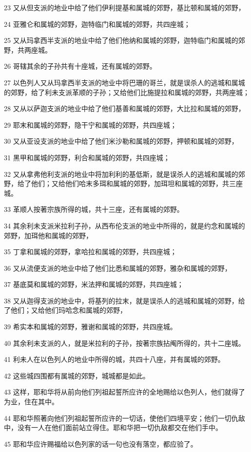 \par 23 又从但支派的地业中给了他们伊利提基和属城的郊野，基比顿和属城的郊野，
\par 24 亚雅仑和属城的郊野，迦特临门和属城的郊野，共四座城；
\par 25 又从玛拿西半支派的地业中给了他们他纳和属城的郊野，迦特临门和属城的郊野，共两座城。
\par 26 哥辖其余的子孙共有十座城，还有属城的郊野。
\par 27 以色列人又从玛拿西半支派的地业中将巴珊的哥兰，就是误杀人的逃城和属城的郊野，给了利未支派革顺的子孙；又给他们比施提拉和属城的郊野，共两座城；
\par 28 又从以萨迦支派的地业中给了他们基善和属城的郊野，大比拉和属城的郊野，
\par 29 耶末和属城的郊野，隐干宁和属城的郊野，共四座城；
\par 30 又从亚设支派的地业中给了他们米沙勒和属城的郊野，押顿和属城的郊野，
\par 31 黑甲和属城的郊野，利合和属城的郊野，共四座城；
\par 32 又从拿弗他利支派的地业中将加利利的基低斯，就是误杀人的逃城和属城的郊野，给了他们；又给他们哈末多珥和属城的郊野，加珥坦和属城的郊野，共三座城。
\par 33 革顺人按著宗族所得的城，共十三座，还有属城的郊野。
\par 34 其余利未支派米拉利子孙，从西布伦支派的地业中所得的，就是约念和属城的郊野，加珥他和属城的郊野，
\par 35 丁拿和属城的郊野，拿哈拉和属城的郊野，共四座城；
\par 36 又从流便支派的地业中给了他们比悉和属城的郊野，雅杂和属城的郊野，
\par 37 基底莫和属城的郊野，米法押和属城的郊野，共四座城；
\par 38 又从迦得支派的地业中，将基列的拉末，就是误杀人的逃城和属城的郊野，给了他们；又给他们玛哈念和属城的郊野，
\par 39 希实本和属城的郊野，雅谢和属城的郊野，共四座城。
\par 40 其余利未支派的人，就是米拉利的子孙，按著宗族拈阄所得的，共十二座城。
\par 41 利未人在以色列人的地业中所得的城，共四十八座，并有属城的郊野。
\par 42 这些城四围都有属城的郊野，城城都是如此。
\par 43 这样，耶和华将从前向他们列祖起誓所应许的全地赐给以色列人，他们就得了为业，住在其中。
\par 44 耶和华照著向他们列祖起誓所应许的一切话，使他们四境平安；他们一切仇敌中，没有一人在他们面前站立得住。耶和华把一切仇敌都交在他们手中。
\par 45 耶和华应许赐福给以色列家的话一句也没有落空，都应验了。

